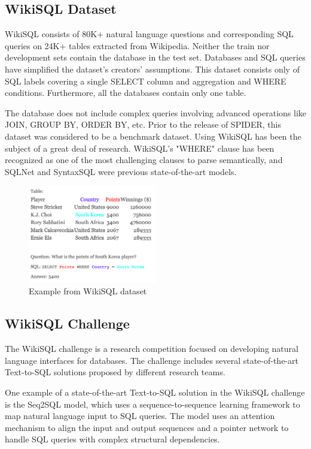 \subsection{WikiSQL Dataset}

WikiSQL consists of 80K+ natural language questions and corresponding SQL queries on 24K+ tables extracted from Wikipedia. Neither the train nor development sets contain the database in the test set. Databases and SQL queries have simplified the dataset's creators' assumptions. This dataset consists only of SQL labels covering a single SELECT column and aggregation and WHERE conditions. Furthermore, all the databases contain only one table.

The database does not include complex queries involving advanced operations like JOIN, GROUP BY, ORDER BY, etc. Prior to the release of SPIDER, this dataset was considered to be a benchmark dataset. Using WikiSQL has been the subject of a great deal of research. WikiSQL's "WHERE" clause has been recognized as one of the most challenging clauses to parse semantically, and SQLNet and SyntaxSQL were previous state-of-the-art models.


\begin{figure}[htb]
    \centering
    \includegraphics[width=0.5\textwidth]{pics/db/WikiSQL.png}
    \caption{Example from WikiSQL dataset\cite{hwang_comprehensive_2019}}
    \label{fig:WikiSQL}
\end{figure}

\subsection{WikiSQL Challenge}

The WikiSQL challenge is a research competition focused on developing natural language interfaces for databases. The challenge includes several state-of-the-art Text-to-SQL solutions proposed by different research teams.

One example of a state-of-the-art Text-to-SQL solution in the WikiSQL challenge is the Seq2SQL model, which uses a sequence-to-sequence learning framework to map natural language input to SQL queries. The model uses an attention mechanism to align the input and output sequences and a pointer network to handle SQL queries with complex structural dependencies.

